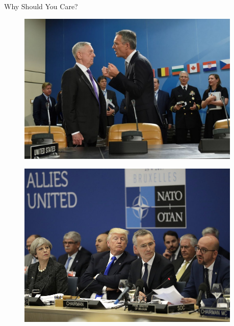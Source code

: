 \documentclass[12pt]{beamer}
\begin{document}
\begin{frame}{Why Should You Care?}

\begin{figure}[htbp]
	\centering
		\includegraphics[width=0.95\textwidth]{mattis-nato.jpg}
	\label{fig:mattis-nato}
\end{figure}


\end{frame}



\begin{frame}[standout] 

\begin{figure}[htbp]
	\centering
		\includegraphics[width=0.95\textwidth]{trump-nato.jpg}
	\label{fig:trump-nato}
\end{figure}


\end{frame}
 
\end{document}
